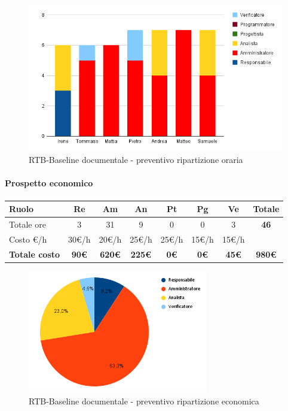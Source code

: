 \begin{figure}[H]
    \centering\includegraphics[width=\textwidth, height=\textheight, keepaspectratio]{images/preventivo/RTB-documentale-ore.png}
    \caption{RTB-Baseline documentale - preventivo ripartizione oraria}
\end{figure}


\paragraph{Prospetto economico}
\begin{center}
	\renewcommand{\arraystretch}{1.8} %
	\begin{tabular}{ |m{10em}|c|c|c|c|c|c|c| }
	\hline
	\textbf{Ruolo} & \textbf{Re} & \textbf{Am} &  \textbf{An} &  \textbf{Pt} &  \textbf{Pg} &  \textbf{Ve} &  \textbf{Totale}\\
    \hline
    Totale ore & 3 & 31 & 9 & 0 & 0 & 3 & \textbf{46}\\
    \hline
    Costo \euro/h & 30\euro/h & 20\euro/h & 25\euro/h & 25\euro/h & 15\euro/h & 15\euro/h & \\
    \hline
    \textbf{Totale costo} & \textbf{90\euro} & \textbf{620\euro} &  \textbf{225\euro} &  \textbf{0\euro} &  \textbf{0\euro} &  \textbf{45\euro} &  \textbf{980\euro}\\
    \hline
	\end{tabular}

    \begin{figure}[H]
        \centering\includegraphics[width=0.7\textwidth, height=0.7\textheight, keepaspectratio]{images/preventivo/RTB-documentale-costo.png}
        \caption{RTB-Baseline documentale - preventivo ripartizione economica}
    \end{figure}
\end{center}


